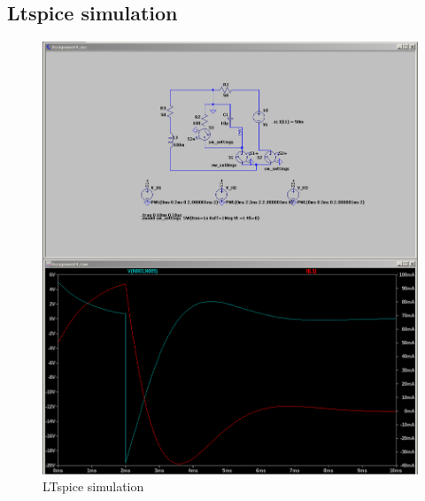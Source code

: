 \documentclass[a4paper]{article}
\begin{document}
\subsection{Ltspice simulation}
\begin{figure}[h!]\centering
   \includegraphics[scale = 0.4]{Figures/assignment4_sim.png}
   \caption{LTspice simulation}
   \label{fig:ltspice}
\end{figure}
\end{document}
